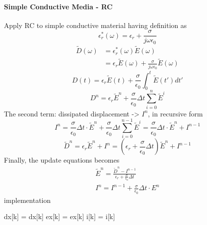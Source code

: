 \paragraph{\msjh Simple Conductive Media - RC}
Apply RC to simple conductive material having definition as
\begin{displaymath}
  \epsilon_r^{*}(\omega) = \epsilon_r + \frac{\sigma}{j \omega \epsilon_0}
\end{displaymath}
\begin{displaymath}
  \begin{split}
    \widetilde{D}(\omega) & = \epsilon_r^{*}(\omega)\widetilde{E}(\omega)\\
    & = \epsilon_r\widetilde{E}(\omega) + \frac{\sigma}{j\omega\epsilon_0}\widetilde{E}(\omega)
  \end{split}
\end{displaymath}
\begin{displaymath}
  D(t) = \epsilon_r\widetilde{E}(t) + \frac{\sigma}{\epsilon_0}\int_0^t\widetilde{E}(t')dt'
\end{displaymath}
\begin{displaymath}
    D^n = \epsilon_r\widetilde{E}^n + \frac{\sigma}{\epsilon_0}\Delta t \sum_{i=0}^{n}\widetilde{E}^i
\end{displaymath}
The second term: dissipated displacement -> $I^n$, in recursive form
\begin{equation}
  I^n = \frac{\sigma}{\epsilon_0}\Delta t\cdot\widetilde{E}^n + \frac{\sigma}{\epsilon_0}\Delta t\sum_{i=0}^{n-1}\widetilde{E}^i = \frac{\sigma}{\epsilon_0}\Delta t\cdot\widetilde{E}^n + I^{n-1}
\end{equation}
\begin{equation}
  \widetilde{D}^n = \epsilon_r\widetilde{E}^n + I^n = (\epsilon_r + \frac{\sigma}{\epsilon_0}\Delta t)\widetilde{E}^n + I^{n-1}
\end{equation}
Finally, the update equations becomes
\begin{gather*}
  \widetilde{E}^n = \frac{\widetilde{D}^n - I^{n-1}}{\displaystyle \epsilon_r +\frac{\sigma}{\epsilon_0}\Delta t}\\
  I^n = I^{n-1} + \frac{\sigma}{\epsilon_0}\Delta t\cdot E^n
\end{gather*}
implementation
\begin{code}
  dx[k] = dx[k]
  ex[k] = ex[k]
  i[k]  = i[k]
\end{code}



